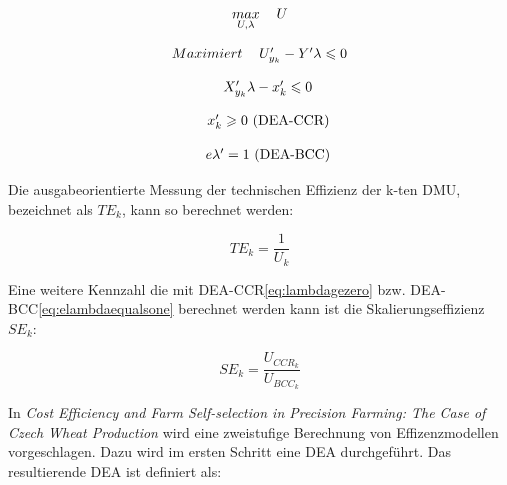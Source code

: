 \begin{equation}\label{eq:maxu}
	\begin{tabular}{rr}
		$\underset{U,\lambda}{max}$ & $U$	 	
	\end{tabular}
\end{equation}

\begin{equation}\label{eq:uy}
	\begin{tabular}{rr}
		$Maximiert$ & $U_{y_k}' - Y'\lambda \leqslant 0$	 	
	\end{tabular}
\end{equation}


\begin{equation}\label{eq:xylambda}
	\begin{tabular}{rr}
		$$ & $X_{y_k}'\lambda - x_k' \leqslant 0$	 	
	\end{tabular}
\end{equation}

\begin{equation}\label{eq:lambdagezero}
	\begin{tabular}{rr}
		$$ & $x_k' \geqslant 0$ (DEA-CCR)	 	
	\end{tabular}
\end{equation}

\begin{equation}\label{eq:elambdaequalsone}
	\begin{tabular}{rr}
		$$ & $e\lambda' = 1$ (DEA-BCC)	 	
	\end{tabular}
\end{equation}

Die ausgabeorientierte Messung der technischen Effizienz der k-ten DMU, bezeichnet als $TE_k$, kann so berechnet werden:

\begin{equation}
	TE_k= \frac{1}{U_k}
\end{equation}

Eine weitere Kennzahl die mit DEA-CCR\eqref{eq:lambdagezero} bzw. DEA-BCC\eqref{eq:elambdaequalsone} berechnet werden kann ist die Skalierungseffizienz $SE_k$:

\begin{equation}
	SE_k = \frac{U_{CCR_k}}{U_{BCC_k}}
\end{equation}

In \textit{Cost Efficiency and Farm Self-selection in Precision Farming: The Case of Czech Wheat Production}\cite{jour:Curtiss2012} wird eine zweistufige Berechnung von Effizenzmodellen vorgeschlagen. Dazu wird im ersten Schritt eine DEA durchgeführt. Das resultierende DEA ist definiert als:

